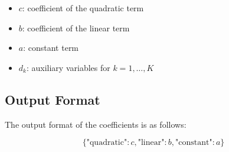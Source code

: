 \documentclass{article}
\begin{document}
\begin{itemize}
    \item \( c \): coefficient of the quadratic term
    \item \( b \): coefficient of the linear term
    \item \( a \): constant term
    \item \( d_k \): auxiliary variables for \( k = 1, \ldots, K \)
\end{itemize}

\subsection*{Output Format}
The output format of the coefficients is as follows:

\[
\{
    \text{"quadratic"}: c,
    \text{"linear"}: b,
    \text{"constant"}: a
\}
\]
\end{document}
